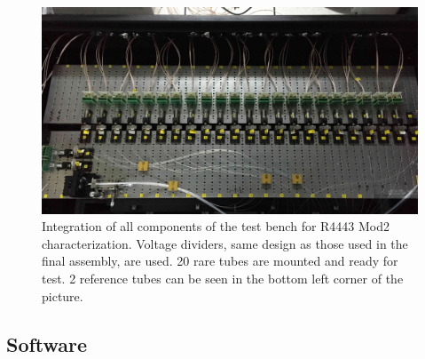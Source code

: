 \documentclass[5p, times]{elsarticle}
\begin{document}

\begin{figure}[t]
 \centering
 \includegraphics[width=130mm]{integration3}
\caption{Integration of all components of the test bench for R4443 Mod2 characterization.
Voltage dividers, same design as those used in the final assembly, are used. 
20 rare tubes are mounted and ready for test.
2 reference tubes can be seen in the bottom left corner of the picture. 
}
\label{fig:integrated_testbench}
\end{figure}

\subsection{Software}
\label{sec:software}
\end{document}
